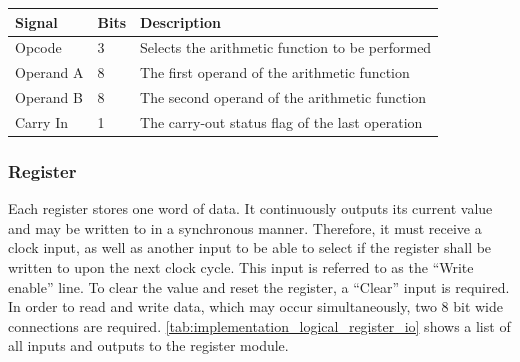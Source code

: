 \begin{table}[H]
    \centering
    \begin{tabular}{|l|l|l|} 
        \hline
        \textbf{\textbf{Signal}} & \textbf{Bits}           & \textbf{Description}                             \\ 
        \hline
        Opcode                   & 3                       & Selects the arithmetic function to be performed  \\ 
        \hline
        Operand A                & 8                       & The first operand of the arithmetic function     \\ 
        \hline
        Operand B                & 8                       & The second operand of the arithmetic function    \\ 
        \hline
        Carry In                 & 1                       & The carry-out status flag of the last operation  \\
        \hline
    \end{tabular}
\end{table}
\caption{Input and output signals of the Arithmetic logic unit}
\label{tab:implementation_logical_alu_io}

\subsubsection{Register}

Each register stores one word of data. It continuously outputs its current value and may be written to in a synchronous manner. Therefore, it must receive a clock input, as well as another input to be able to select if the register shall be written to upon the next clock cycle. This input is referred to as the ``Write enable'' line. To clear the value and reset the register, a ``Clear'' input is required. In order to read and write data, which may occur simultaneously, two 8 bit wide connections are required. \autoref{tab:implementation_logical_register_io} shows a list of all inputs and outputs to the register module.

